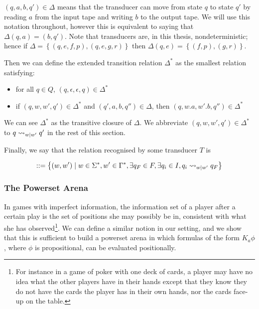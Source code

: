 \documentclass[12pt, a4paper]{article}
\begin{document}
$(q, a, b, q') \in \Delta$ means that the transducer can move from state $q$ to
state $q'$ by reading $a$ from the input tape and writing $b$ to the output
tape. We will use this notation throughout, however this is equivalent to saying
that $\Delta(q, a) = (b, q')$. Note that transducers are, in this thesis,
nondeterministic; hence if $\Delta = \left\{ (q, e, f, p), (q, e, g, r)
\right\}$ then $\Delta(q, e) = \left\{ (f, p), (g, r) \right\}$.

Then we can define the extended transition relation $\Delta^\ast$ as the
smallest relation satisfying:

\begin{itemize}
\item for all $q \in Q$, $(q, \epsilon, \epsilon, q) \in \Delta^\ast$
\item if $(q, w, w', q') \in \Delta^\ast$ and $(q', a, b, q'') \in \Delta$, then
  $(q, w . a, w' . b, q'') \in \Delta^\ast$
  
\end{itemize}

We can see $\Delta^\ast$ as the transitive closure of $\Delta$. We abbreviate
$(q, w, w', q') \in \Delta^\ast$ to $q \rightsquigarrow_{w \mid w'} q'$ in the rest of
this section.

Finally, we say that the relation recognised by some transducer $T$ is

\begin{align*}
  [T] ::= \left\{ (w, w') \mid w \in \Sigma^\ast, w' \in \Gamma^\ast, \exists q_F \in F, \exists q_i \in I, q_i \rsarrow_{w \mid w'} q_F \right\}
\end{align*}

\subsubsection{The Powerset Arena}
\label{sec:PowersetArenaena}

In games with imperfect information, the information set of a player after a
certain play is the set of positions she may possibly be in, consistent with
what she has observed\footnote{For instance in a game of poker with one deck of cards, a
player may have no idea what the other players have in their hands except that
they know they do not have the cards the player has in their own hands, nor the
cards face-up on the table.}. We can define a similar notion in our setting, and
we show that this is sufficient to build a powerset arena in which formulas of
the form $K_a \phi$, where $\phi$ is propositional, can be evaluated positionally. 
\end{document}
